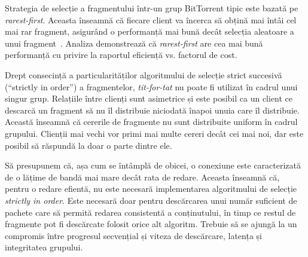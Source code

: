 Strategia de selecție a fragmentului într-un grup BitTorrent tipic este bazată
pe \textit{rarest-first}. Aceasta înseamnă că fiecare client va încerca să
obțină mai întâi cel mai rar fragment, asigurând o performanță mai bună decât
selecția aleatoare a unui fragment~\cite{bt-analysis}\cite{scaling-networks}.
Analiza demonstrează că \textit{rarest-first} are cea mai bună performanță cu
privire la raportul eficiență vs. factorul de cost.

Drept consecință a particularităților algoritmului de selecție strict
succesivă (``strictly in order'') a fragmentelor, \textit{tit-for-tat} nu
poate fi utilizat în cadrul unui singur grup. Relațiile între clienți sunt
asimetrice și este posibil ca un client ce descarcă un fragment să nu îl
distribuie niciodată înapoi unuia care îl distribuie. Această înseamnă că
cererile de fragmente nu sunt distribuite uniform în cadrul grupului. Clienții
mai vechi vor primi mai multe cereri decât cei mai noi, dar este posibil să
răspundă la doar o parte dintre ele.

Să presupunem că, așa cum se întâmplă de obicei, o conexiune este caracterizată
de o lățime de bandă mai mare decât rata de redare. Aceasta înseamnă că, pentru
o redare efientă, nu este necesară implementarea algoritmului de selecție
\textit{strictly in order}. Este necesară doar pentru descărcarea unui număr
suficient de pachete care să permită redarea consistentă a conținutului, în
timp ce restul de fragmente pot fi descărcate folosit orice alt algoritm.
Trebuie să se ajungă la un compromis între progresul secvențial și viteza de
descărcare, latența și integritatea grupului.

